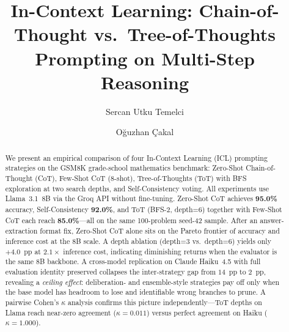 ﻿\documentclass[runningheads]{llncs}
\begin{document}
\title{In-Context Learning: Chain-of-Thought vs.\ Tree-of-Thoughts
Prompting on Multi-Step Reasoning}


\author{Sercan Utku Temelci \and
O\u{g}uzhan \c{C}akal}



\maketitle

\begin{abstract}
We present an empirical comparison of four In-Context Learning (ICL)
prompting strategies on the GSM8K grade-school mathematics benchmark:
Zero-Shot Chain-of-Thought (CoT), Few-Shot CoT (8-shot),
Tree-of-Thoughts (ToT) with BFS exploration at two search depths,
and Self-Consistency voting.
All experiments use Llama~3.1~8B via the Groq API without fine-tuning.
Zero-Shot CoT achieves \textbf{95.0\%} accuracy, Self-Consistency
\textbf{92.0\%}, and ToT (BFS-2, depth=6) together with Few-Shot CoT
each reach \textbf{85.0\%}---all on the same 100-problem seed-42 sample.
After an answer-extraction format fix, Zero-Shot CoT alone sits on the
Pareto frontier of accuracy and inference cost at the 8B scale.
A depth ablation (depth=3 vs.\ depth=6) yields only $+4.0$~pp at
$2.1\times$ inference cost, indicating diminishing returns when the
evaluator is the same 8B backbone.
A cross-model replication on Claude Haiku~4.5 with full evaluation
identity preserved collapses the inter-strategy gap from $14$~pp to
$2$~pp, revealing a \emph{ceiling effect}: deliberation- and
ensemble-style strategies pay off only when the base model has
headroom to lose and identifiable wrong branches to prune.
A pairwise Cohen's $\kappa$ analysis confirms this picture
independently---ToT depths on Llama reach near-zero agreement
($\kappa{=}0.011$) versus perfect agreement on Haiku
($\kappa{=}1.000$).
\end{abstract}


\end{document}
